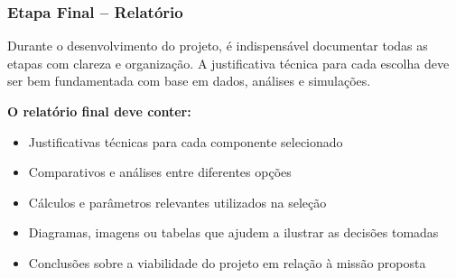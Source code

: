 \subsubsection*{Etapa Final – Relatório}

Durante o desenvolvimento do projeto, é indispensável documentar todas as etapas com clareza e organização. A justificativa técnica para cada escolha deve ser bem fundamentada com base em dados, análises e simulações.

\textbf{O relatório final deve conter:}
\begin{itemize}
    \item Justificativas técnicas para cada componente selecionado
    \item Comparativos e análises entre diferentes opções
    \item Cálculos e parâmetros relevantes utilizados na seleção
    \item Diagramas, imagens ou tabelas que ajudem a ilustrar as decisões tomadas
    \item Conclusões sobre a viabilidade do projeto em relação à missão proposta
\end{itemize}
